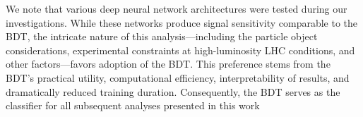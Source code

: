 We note that various deep neural network architectures were tested during our investigations. While these networks produce signal sensitivity comparable to the BDT, the intricate nature of this analysis—including the particle object considerations, experimental constraints at high-luminosity LHC conditions, and other factors—favors adoption of the BDT. This preference stems from the BDT's practical utility, computational efficiency, interpretability of results, and dramatically reduced training duration. Consequently, the BDT serves as the classifier for all subsequent analyses presented in this work
